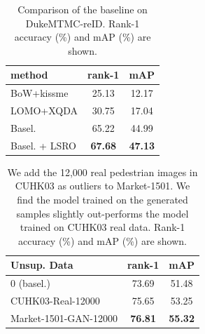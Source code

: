 \documentclass[10pt,twocolumn,letterpaper]{article}
\begin{document}
\setlength{\tabcolsep}{15pt}
\begin{table}
\begin{center}
\begin{tabular}{l|cc}
\hline
method & rank-1 & mAP \\
\hline
BoW+kissme \cite{zheng2015scalable} & 25.13 & 12.17 \\
LOMO+XQDA \cite{liao2015person} & 30.75 & 17.04\\
\hline
Basel. \cite{zheng2016survey,zheng2016discriminatively} & 65.22 & 44.99\\ 
Basel. + LSRO & \textbf{67.68}  & \textbf{47.13}\\
\hline
\end{tabular}
\end{center}
\caption{Comparison of the baseline on DukeMTMC-reID. Rank-1 accuracy (\%) and mAP (\%) are shown.}
\label{table:duke}
\end{table}

\setlength{\tabcolsep}{10pt}
\begin{table}
\begin{center}
\begin{tabular}{l|cc}
\hline
Unsup. Data & rank-1 & mAP \\
\hline
0 (basel.) & 73.69 & 51.48\\ 
CUHK03-Real-12000 & 75.65  & 53.25 \\
Market-1501-GAN-12000 & \textbf{76.81} & \textbf{55.32} \\
\hline
\end{tabular}
\end{center}
\caption{We add the 12,000 real pedestrian images in CUHK03 as outliers to Market-1501. We find the model trained on the generated samples slightly out-performs the model trained on CUHK03 real data. Rank-1 accuracy (\%) and mAP (\%) are shown.}
\label{table:addcuhk}
\end{table}
\end{document}
